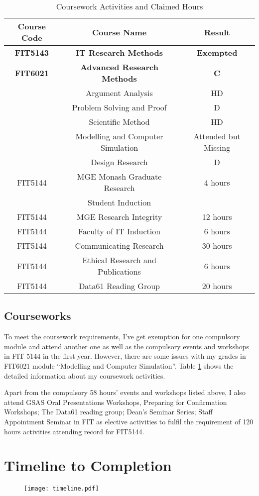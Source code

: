 \begin{table}[h]
\centering
\begin{tabular}{|c|c|c|}
\hline
\bf Course Code & \bf Course Name & \bf Result \\ \hline
\bf FIT5143 & \bf IT Research Methods & \bf Exempted \\ \hline
\bf  FIT6021 & \bf Advanced Research Methods & \bf C \\ \hline
& Argument Analysis & HD \\ \hline
& Problem Solving and Proof & D \\ \hline
& Scientific Method & HD \\ \hline
& Modelling and Computer Simulation & Attended but Missing \\ \hline
& Design Research & D \\ \hline
FIT5144 & MGE Monash Graduate Research & 4 hours \\ 
& Student Induction &  \\ \hline
FIT5144 & MGE  Research Integrity & 12 hours \\ \hline
FIT5144 & Faculty of IT Induction & 6 hours \\ \hline
FIT5144 & Communicating Research & 30 hours\\ \hline
FIT5144 & Ethical Research and Publications & 6 hours\\ \hline
FIT5144 & Data61 Reading Group & 20 hours\\ \hline
\end{tabular}
\caption{Coursework Activities and Claimed Hours}
\label{tlb:coursework}
\end{table}

\section{Courseworks}
To meet the coursework requirements, I've get exemption for one compulsory module and attend another one as well as the compulsory events and workshops in FIT 5144 in the first year. However, there are some issues with my grades in FIT6021 module ``Modelling and Computer Simulation''. Table \ref{tlb:coursework} shows the detailed information about my coursework activities. 

Apart from the compulsory 58 hours' events and workshops listed above, I also attend GSAS Oral Presentations Workshops, Preparing for Confirmation Workshops; The Data61 reading group; Dean's Seminar Series; Staff Appointment Seminar in FIT as elective activities to fulfil the requirement of 120 hours activities attending record for FIT5144.


\chapter{Timeline to Completion}
\begin{figure}[h]
\texttt{[image: timeline.pdf]}
\end{figure}
